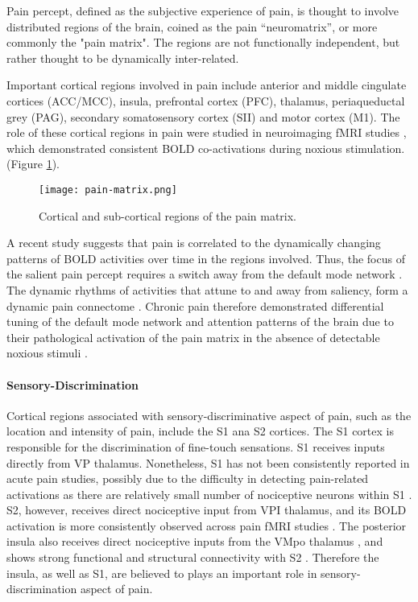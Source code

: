 Pain percept, defined as the subjective experience of pain, is thought to involve distributed regions of the brain, coined as the pain “neuromatrix”\cite{Melzack1999a}, or more commonly the "pain matrix". The regions are not functionally independent, but rather thought to be dynamically inter-related. 

 Important cortical regions involved in pain include anterior and middle cingulate cortices (ACC/MCC), insula, prefrontal cortex (PFC), thalamus, periaqueductal grey (PAG), secondary somatosensory cortex (SII) and motor cortex (M1). The role of these cortical regions in pain were studied in neuroimaging fMRI studies \cite{Apkarian2013c,Wager2013,Davis2012a}, which demonstrated consistent BOLD co-activations during noxious stimulation. (Figure \ref{fig:pain-matrix}).

 \begin{figure}[ht]
 \texttt{[image: pain-matrix.png]}
 \centering
 \caption{ Cortical and sub-cortical regions of the pain matrix. \protect\cite{Tracey2007a}} 
 \label{fig:pain-matrix}
 \end{figure}
 
A recent study suggests that pain is correlated to the dynamically changing patterns of BOLD activities over time in the regions involved. Thus, the focus of the salient pain percept requires a switch away from the default mode network \cite{Kucyi2013}. The dynamic rhythms of activities that attune to and away from saliency, form a dynamic pain connectome \cite{Kucyi2015}. Chronic pain therefore demonstrated differential tuning of the default mode network and attention patterns of the brain due to their pathological activation of the pain matrix in the absence of detectable noxious stimuli \cite{Baliki2008,Legrain2009}.

\paragraph{Sensory-Discrimination}
Cortical regions associated with sensory-discriminative aspect of pain, such as the location and intensity of pain, include the S1 ana S2 cortices. The S1 cortex is responsible for the discrimination of fine-touch sensations. S1 receives inputs directly from VP thalamus. Nonetheless, S1 has not been consistently reported in acute pain studies, possibly due to the difficulty in detecting pain-related activations as there are relatively small number of nociceptive neurons within S1 \cite{bushnell1999pain}. S2, however, receives direct nociceptive input from VPI thalamus, and its BOLD activation is more consistently observed across pain fMRI studies \cite{Wager2013,Brodersen2012}. The posterior insula also receives direct nociceptive inputs from the VMpo thalamus \cite{Craig2003}, and shows strong functional and structural connectivity with S2 \cite{Wiech2014}. Therefore the insula, as well as S1, are believed to plays an important role in sensory-discrimination aspect of pain. 

